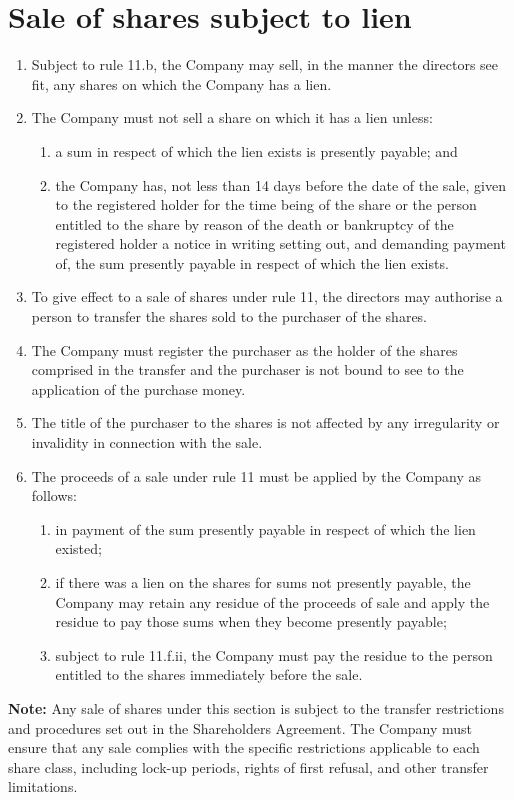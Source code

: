 \section{Sale of shares subject to lien}

\begin{enumerate}[label=(\alph*)]
    \item Subject to rule 11.b, the Company may sell, in the manner the directors see fit, any shares on which the Company has a lien.
    
    \item The Company must not sell a share on which it has a lien unless:
    \begin{enumerate}[label=(\roman*)]
        \item a sum in respect of which the lien exists is presently payable; and
        \item the Company has, not less than 14 days before the date of the sale, given to the registered holder for the time being of the share or the person entitled to the share by reason of the death or bankruptcy of the registered holder a notice in writing setting out, and demanding payment of, the sum presently payable in respect of which the lien exists.
    \end{enumerate}
    
    \item To give effect to a sale of shares under rule 11, the directors may authorise a person to transfer the shares sold to the purchaser of the shares.
    
    \item The Company must register the purchaser as the holder of the shares comprised in the transfer and the purchaser is not bound to see to the application of the purchase money.
    
    \item The title of the purchaser to the shares is not affected by any irregularity or invalidity in connection with the sale.
    
    \item The proceeds of a sale under rule 11 must be applied by the Company as follows:
    \begin{enumerate}[label=(\roman*)]
        \item in payment of the sum presently payable in respect of which the lien existed;
        \item if there was a lien on the shares for sums not presently payable, the Company may retain any residue of the proceeds of sale and apply the residue to pay those sums when they become presently payable;
        \item subject to rule 11.f.ii, the Company must pay the residue to the person entitled to the shares immediately before the sale.
    \end{enumerate}
\end{enumerate}

\textbf{Note:} Any sale of shares under this section is subject to the transfer restrictions and procedures set out in the Shareholders Agreement. The Company must ensure that any sale complies with the specific restrictions applicable to each share class, including lock-up periods, rights of first refusal, and other transfer limitations. 